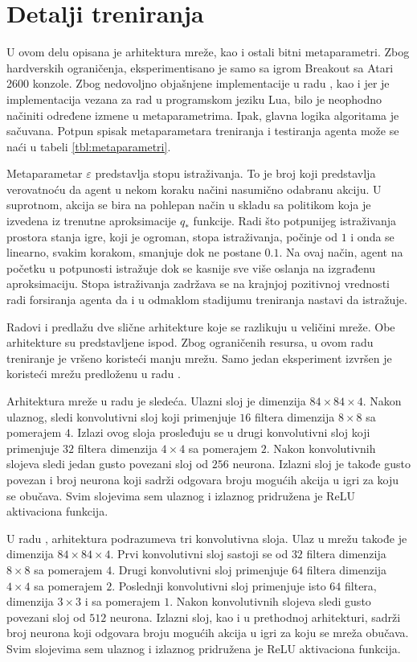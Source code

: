 \section{Detalji treniranja}
\label{sec:treniranje}
U ovom delu opisana je arhitektura mreže, kao i ostali bitni metaparametri. Zbog hardverskih ograničenja, eksperimentisano je samo sa igrom Breakout sa Atari 2600 konzole. Zbog nedovoljno objašnjene implementacije u radu \cite{dqn_mnih}, kao i jer je implementacija vezana za rad \cite{dqn_dm} u programskom jeziku Lua, bilo je neophodno načiniti određene izmene u metaparametrima. Ipak, glavna logika algoritama je sačuvana. Potpun spisak metaparametara treniranja i testiranja agenta može se naći u tabeli \ref{tbl:metaparametri}.
\par 
Metaparametar $\varepsilon$ predstavlja stopu istraživanja. To je broj koji predstavlja verovatnoću da agent u nekom koraku načini nasumično odabranu akciju. U suprotnom, akcija se bira na pohlepan način u skladu sa politikom koja je izvedena iz trenutne aproksimacije $q_*$ funkcije. Radi što potpunijeg istraživanja prostora stanja igre, koji je ogroman, stopa istraživanja, počinje od $1$ i onda se linearno, svakim korakom, smanjuje dok ne postane $0.1$. Na ovaj način, agent na početku u potpunosti istražuje dok se kasnije sve više oslanja na izgrađenu aproksimaciju. Stopa istraživanja zadržava se na krajnjoj pozitivnoj vrednosti radi forsiranja agenta da i u odmaklom stadijumu treniranja nastavi da istražuje.
\par 
Radovi  \cite{dqn_mnih} i \cite{dqn_dm} predlažu dve slične arhitekture koje se razlikuju u veličini mreže. Obe arhitekture su predstavljene ispod. Zbog ograničenih resursa, u ovom radu treniranje je vršeno koristeći manju mrežu. Samo jedan eksperiment izvršen je koristeći mrežu predloženu u radu \cite{dqn_dm}.
\par 
Arhitektura mreže u radu \cite{dqn_mnih} je sledeća. Ulazni sloj je dimenzija $84 \times 84 \times 4$. Nakon ulaznog, sledi konvolutivni sloj koji primenjuje $16$ filtera dimenzija $8 \times 8$ sa pomerajem $4$. Izlazi ovog sloja prosleđuju se u drugi konvolutivni sloj koji primenjuje $32$ filtera dimenzija $4 \times 4$ sa pomerajem $2$. Nakon konvolutivnih slojeva sledi jedan gusto povezani sloj od $256$ neurona. Izlazni sloj je takođe gusto povezan i broj neurona koji sadrži odgovara broju mogućih akcija u igri za koju se obučava. Svim slojevima sem ulaznog i izlaznog pridružena je ReLU aktivaciona funkcija.
\par 
U radu \cite{dqn_dm}, arhitektura podrazumeva tri konvolutivna sloja. Ulaz u mrežu takođe je dimenzija $84 \times 84 \times 4$. Prvi konvolutivni sloj sastoji se od $32$ filtera dimenzija $8 \times 8$ sa pomerajem $4$. Drugi konvolutivni sloj primenjuje $64$ filtera dimenzija $4 \times 4$ sa pomerajem $2$. Poslednji konvolutivni sloj primenjuje isto $64$ filtera, dimenzija $3 \times 3$ i sa pomerajem $1$. Nakon konvolutivnih slojeva sledi gusto povezani sloj od $512$ neurona. Izlazni sloj, kao i u prethodnoj arhitekturi, sadrži broj neurona koji odgovara broju mogućih akcija u igri za koju se mreža obučava. Svim slojevima sem ulaznog i izlaznog pridružena je ReLU aktivaciona funkcija.
